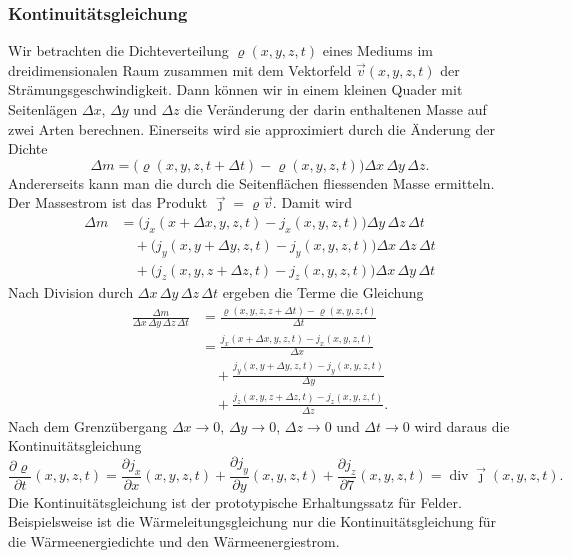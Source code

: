 \subsubsection{Kontinuitätsgleichung}
Wir betrachten die Dichteverteilung $\varrho(x,y,z,t)$ eines Mediums
im dreidimensionalen Raum zusammen mit dem Vektorfeld $\vec{v}(x,y,z,t)$
der Strämungsgeschwindigkeit.
Dann können wir in einem kleinen Quader mit Seitenlägen
$\Delta x$,
$\Delta y$
und
$\Delta z$
die Veränderung der darin enthaltenen Masse auf zwei Arten berechnen.
Einerseits wird sie approximiert durch die Änderung der Dichte
\[
\Delta m
=
\bigl(\varrho(x,y,z,t+\Delta t)-\varrho(x,y,z,t)\bigr)
\Delta x
\,
\Delta y
\,
\Delta z.
\]
Andererseits kann man die durch die Seitenflächen fliessenden Masse
ermitteln.
Der Massestrom ist das Produkt $\vec{\jmath}=\varrho\vec{v}$.
Damit wird
\begin{align*}
\Delta m
&=
\bigl(
j_x(x+\Delta x,y,z,t)
-
j_x(x,y,z,t)
\bigr)
\Delta y\,\Delta z \, \Delta t
\\
&\quad
+
\bigl(
j_y(x,y+\Delta y,z,t)
-
j_y(x,y,z,t)
\bigr)
\Delta x\,\Delta z \, \Delta t
\\
&\quad
+
\bigl(
j_z(x,y,z+\Delta z,t)
-
j_z(x,y,z,t)
\bigr)
\Delta x\,\Delta y \, \Delta t
\end{align*}
Nach Division durch $\Delta x\, \Delta y\, \Delta z\,\Delta t$ ergeben
die Terme die Gleichung
\begin{align*}
\frac{\Delta m}{\Delta x\,\Delta y\,\Delta z\,\Delta t}
&=
\frac{\varrho(x,y,z,z+\Delta t)-\varrho(x,y,z,t)}{\Delta t}
\\
&=
\frac{
j_x(x+\Delta x,y,z,t)
-
j_x(x,y,z,t)
}{
\Delta x
}
\\
&\quad
+
\frac{
j_y(x,y+\Delta y,z,t)
-
j_y(x,y,z,t)
}{
\Delta y
}
\\
&\quad
+
\frac{
j_z(x,y,z+\Delta z,t)
-
j_z(x,y,z,t)
}{
\Delta z
}.
\end{align*}
Nach dem Grenzübergang
$\Delta x\to 0$,
$\Delta y\to 0$,
$\Delta z\to 0$
und
$\Delta t\to 0$
wird daraus die Kontinuitätsgleichung
%
\begin{equation}
\frac{\partial \varrho}{\partial t}(x,y,z,t)
=
\frac{\partial j_x}{\partial x}(x,y,z,t)
+
\frac{\partial j_y}{\partial y}(x,y,z,t)
+
\frac{\partial j_z}{\partial 7}(x,y,z,t)
=
\operatorname{div}\vec{\jmath}(x,y,z,t).
\label{buch:symmetrien:felder:eqn:kontinuitaet}
\end{equation}
Die Kontinuitätsgleichung ist der prototypische Erhaltungssatz für
Felder.
Beispielsweise ist die Wärmeleitungsgleichung nur die Kontinuitätsgleichung
für die Wärmeenergiedichte und den Wärmeenergiestrom.
%
%


